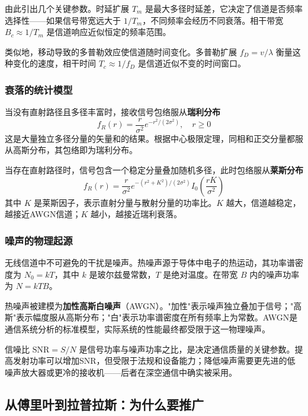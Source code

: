 由此引出几个关键参数。时延扩展 $T_m$ 是最大多径时延差，它决定了信道是否频率选择性——如果信号带宽远大于 $1/T_m$，不同频率会经历不同衰落。相干带宽 $B_c \approx 1/T_m$ 是信道响应近似恒定的频率范围。

类似地，移动导致的多普勒效应使信道随时间变化。多普勒扩展 $f_D = v/\lambda$ 衡量这种变化的速度，相干时间 $T_c \approx 1/f_D$ 是信道近似不变的时间窗口。

\subsubsection{衰落的统计模型}

当没有直射路径且多径丰富时，接收信号包络服从\textbf{瑞利分布}
\begin{equation}
    f_R(r) = \frac{r}{\sigma^2} e^{-r^2/(2\sigma^2)}, \quad r \geq 0
\end{equation}
这是大量独立多径分量的矢量和的结果。根据中心极限定理，同相和正交分量都服从高斯分布，其包络即为瑞利分布。

当存在直射路径时，信号包含一个稳定分量叠加随机多径，此时包络服从\textbf{莱斯分布}
\begin{equation}
    f_R(r) = \frac{r}{\sigma^2} e^{-(r^2+K^2)/(2\sigma^2)} I_0\left(\frac{rK}{\sigma^2}\right)
\end{equation}
其中 $K$ 是莱斯因子，表示直射分量与散射分量的功率比。$K$ 越大，信道越稳定，越接近AWGN信道；$K$ 越小，越接近瑞利衰落。

\subsubsection{噪声的物理起源}

无线信道中不可避免的干扰是噪声。热噪声源于导体中电子的热运动，其功率谱密度为 $N_0 = kT$，其中 $k$ 是玻尔兹曼常数，$T$ 是绝对温度。在带宽 $B$ 内的噪声功率为 $N = kTB$。

热噪声被建模为\textbf{加性高斯白噪声}（AWGN）。"加性"表示噪声独立叠加于信号；"高斯"表示幅度服从高斯分布；"白"表示功率谱密度在所有频率上为常数。AWGN是通信系统分析的标准模型，实际系统的性能最终都受限于这一物理噪声。

信噪比 $\text{SNR} = S/N$ 是信号功率与噪声功率之比，是决定通信质量的关键参数。提高发射功率可以增加SNR，但受限于法规和设备能力；降低噪声需要更先进的低噪声放大器或更冷的接收机——后者在深空通信中确实被采用。

\subsection{从傅里叶到拉普拉斯：为什么要推广}

